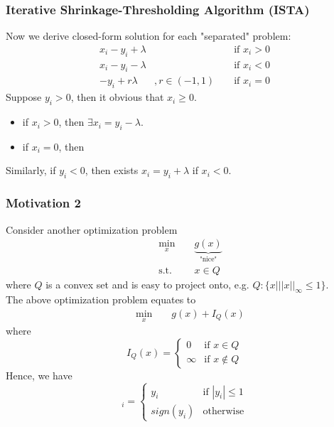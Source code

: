 \documentclass{beamer}
\begin{document}
\begin{frame}
\frametitle{Iterative Shrinkage-Thresholding Algorithm (ISTA)}
Now we derive closed-form solution for each "separated" problem: 
\begin{align}
    x_i-y_i + \lambda & && \text{ if } x_i > 0 \\
    x_i-y_i - \lambda & && \text{ if } x_i < 0 \\
    -y_i + r \lambda &, r \in (-1,1) && \text{ if } x_i = 0 
\end{align}
Suppose $y_i > 0$, then it obvious that $x_i \geq 0 $. 
\begin{itemize}
    \item if $x_i > 0$, then $\exists x_i = y_i - \lambda$.
    \item if $x_i = 0$, then 
\end{itemize}
Similarly, if $y_i < 0$, then exists $x_i = y_i + \lambda$ if $x_i < 0$.
\end{frame}

\begin{frame}
\frametitle{Motivation 2}
Consider another optimization problem
\begin{equation}
\begin{aligned}
    &  \underset{x}{\text{ min }}
    && \underbrace{g(x)}_{\text{"nice"}} \\
    &  \text{ s.t. } 
    && x \in Q
\end{aligned}
\end{equation}
where $Q$ is a convex set and is easy to project onto, e.g. $Q: \{ x| ||x||_{\infty} \leq 1 \}$. \\
The above optimization problem equates to 
\begin{equation}
\begin{aligned}
    &  \underset{x}{\text{ min }}
    && g(x) + I_Q(x) 
\end{aligned}
\end{equation}
where 
\begin{equation}
    I_Q (x) = 
   \begin{cases}
   0 &\mbox{if } x \in Q  \\
   \infty &\mbox{if } x \not \in Q
   \end{cases}
  \end{equation}
Hence, we have 
\begin{equation}
    [P_Q(y)]_i =
   \begin{cases}
   y_i &\mbox{if } |y_i| \leq 1  \\
   sign(y_i) &\mbox{otherwise} 
   \end{cases}
  \end{equation}

\end{frame}
\end{document}
